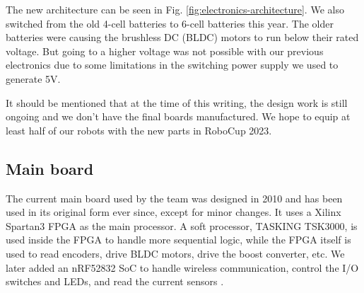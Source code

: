 \documentclass[runningheads]{llncs}
\begin{document}
The new architecture can be seen in Fig. \ref{fig:electronics-architecture}. We also switched from the old 4-cell batteries to 6-cell batteries this year. The older batteries were causing the brushless DC (BLDC) motors to run below their rated voltage. But going to a higher voltage was not possible with our previous electronics due to some limitations in the switching power supply we used to generate 5V.

It should be mentioned that at the time of this writing, the design work is still ongoing and we don't have the final boards manufactured. We hope to equip at least half of our robots with the new parts in RoboCup 2023.

\subsection{Main board}
The current main board used by the team was designed in 2010 and has been used in its original form ever since, except for minor changes. It uses a Xilinx Spartan3 FPGA as the main processor. A soft processor, TASKING TSK3000, is used inside the FPGA to handle more sequential logic, while the FPGA itself is used to read encoders, drive BLDC motors, drive the boost converter, etc. We later added an nRF52832 SoC to handle wireless communication, control the I/O switches and LEDs, and read the current sensors \cite{ref_ETDP2018}.
\end{document}
